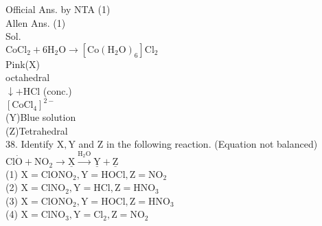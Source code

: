 \documentclass[10pt]{article}
\begin{document}
Official Ans. by NTA (1)\\
Allen Ans. (1)\\
Sol.\\
\(\mathrm{CoCl}_{2}+6 \mathrm{H}_{2} \mathrm{O} \longrightarrow\left[\mathrm{Co}\left(\mathrm{H}_{2} \mathrm{O}\right)_{6}\right] \mathrm{Cl}_{2}\)\\
Pink(X)\\
octahedral\\
\(\downarrow+\mathrm{HCl}\) (conc.)\\
\(\left[\mathrm{CoCl}_{4}\right]^{2-}\)\\
(Y)Blue solution\\
(Z)Tetrahedral\\
38. Identify \(\mathrm{X}, \mathrm{Y}\) and Z in the following reaction. (Equation not balanced)\\
\(\mathrm{Cl} \dot{\mathrm{O}}+\mathrm{NO}_{2} \rightarrow \underline{\mathrm{X}} \xrightarrow{\mathrm{H}_{2} \mathrm{O}} \underline{\mathrm{Y}}+\underline{\mathrm{Z}}\)\\
(1) \(\mathrm{X}=\mathrm{ClONO}_{2}, \mathrm{Y}=\mathrm{HOCl}, \mathrm{Z}=\mathrm{NO}_{2}\)\\
(2) \(\mathrm{X}=\mathrm{ClNO}_{2}, \mathrm{Y}=\mathrm{HCl}, \mathrm{Z}=\mathrm{HNO}_{3}\)\\
(3) \(\mathrm{X}=\mathrm{ClONO}_{2}, \mathrm{Y}=\mathrm{HOCl}, \mathrm{Z}=\mathrm{HNO}_{3}\)\\
(4) \(\mathrm{X}=\mathrm{ClNO}_{3}, \mathrm{Y}=\mathrm{Cl}_{2}, \mathrm{Z}=\mathrm{NO}_{2}\)
\end{document}
